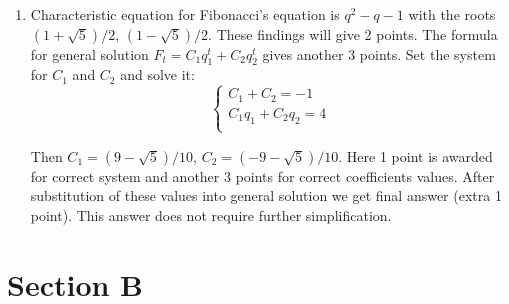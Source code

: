 \documentclass[12pt]{article} %
\theoremstyle{definition} %
\begin{document}
\begin{enumerate}
\item Characteristic equation for Fibonacci’s equation is $q^2 - q -1$ 
with the roots $(1+\sqrt 5)/2$, $(1-\sqrt 5)/2$.  
These findings will give 2 points. 
The formula for general solution $F_t = C_1 q_1^t + C_2 q_2^t$ gives another 3 points. 
Set the system for $C_1$ and $C_2$  and solve it: 
\[
\begin{cases}
    C_1 + C_2 = -1 \\
    C_1 q_1 + C_2 q_2 = 4 \\
\end{cases}
\]

Then $C_1 = (9 - \sqrt 5)/10$, $C_2 = (-9 - \sqrt 5)/10$. 
Here 1 point is awarded for correct system and another 3 points for correct coefficients values. 
After substitution of these values into general solution we get final answer (extra 1 point). 
This answer does not require further simplification.
\end{enumerate}


\section*{Section B}
\end{document}
